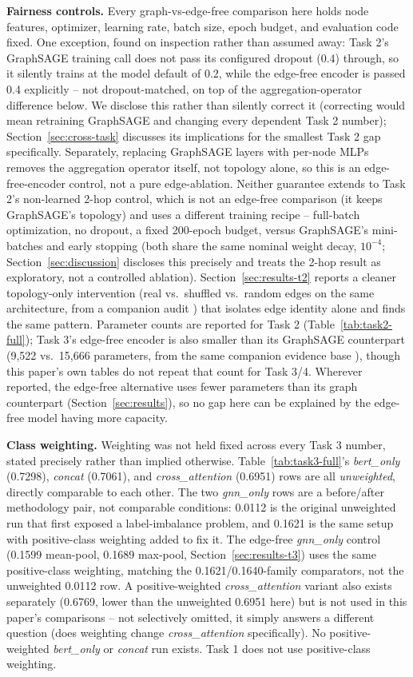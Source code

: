\textbf{Fairness controls.} Every graph-vs-edge-free comparison here holds node features,
optimizer, learning rate, batch size, epoch budget, and evaluation code fixed. One exception,
found on inspection rather than assumed away: Task 2's GraphSAGE training call does not pass
its configured dropout (0.4) through, so it silently trains at the model default of 0.2,
while the edge-free encoder is passed 0.4 explicitly -- not dropout-matched, on top of the
aggregation-operator difference below. We disclose this rather than silently correct it
(correcting would mean retraining GraphSAGE and changing every dependent Task 2 number);
Section~\ref{sec:cross-task} discusses its implications for the smallest Task 2 gap
specifically. Separately, replacing GraphSAGE layers with per-node MLPs removes the
aggregation operator itself, not topology alone, so this is an edge-free-encoder control, not
a pure edge-ablation. Neither guarantee extends to Task 2's non-learned 2-hop control, which
is not an edge-free comparison (it keeps GraphSAGE's topology) and uses a different training
recipe -- full-batch optimization, no dropout, a fixed 200-epoch budget, versus GraphSAGE's
mini-batches and early stopping (both share the same nominal weight decay, $10^{-4}$;
Section~\ref{sec:discussion} discloses this precisely and treats the 2-hop result as
exploratory, not a controlled ablation). Section~\ref{sec:results-t2} reports a cleaner
topology-only intervention (real vs.\ shuffled vs.\ random edges on the same architecture,
from a companion audit \cite{tismir_audit}) that isolates edge identity alone and finds the
same pattern. Parameter counts are reported for Task 2 (Table~\ref{tab:task2-full}); Task 3's
edge-free encoder is also smaller than its GraphSAGE counterpart (9,522 vs.\ 15,666
parameters, from the same companion evidence base \cite{tismir_audit}), though this paper's
own tables do not repeat that count for Task 3/4. Wherever reported, the edge-free
alternative uses fewer parameters than its graph counterpart (Section~\ref{sec:results}), so
no gap here can be explained by the edge-free model having more capacity.

\textbf{Class weighting.} Weighting was not held fixed across every Task 3 number, stated
precisely rather than implied otherwise. Table~\ref{tab:task3-full}'s \textit{bert\_only}
(0.7298), \textit{concat} (0.7061), and \textit{cross\_attention} (0.6951) rows are all
\emph{unweighted}, directly comparable to each other. The two \textit{gnn\_only} rows are a
before/after methodology pair, not comparable conditions: 0.0112 is the original unweighted
run that first exposed a label-imbalance problem, and 0.1621 is the same setup with
positive-class weighting added to fix it. The edge-free \textit{gnn\_only} control (0.1599
mean-pool, 0.1689 max-pool, Section~\ref{sec:results-t3}) uses the same positive-class
weighting, matching the 0.1621/0.1640-family comparators, not the unweighted 0.0112 row. A
positive-weighted \textit{cross\_attention} variant also exists separately (0.6769, lower
than the unweighted 0.6951 here) but is not used in this paper's comparisons -- not
selectively omitted, it simply answers a different question (does weighting change
\textit{cross\_attention} specifically). No positive-weighted \textit{bert\_only} or
\textit{concat} run exists. Task 1 does not use positive-class weighting.

